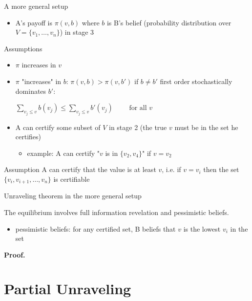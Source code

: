 \documentclass[bigger]{beamer}
\begin{document}
\begin{frame}[label={sec:orgheadline4}]{A more general setup}
\begin{itemize}
\item A's payoff is \(\pi(v,b)\) where \(b\) is B's belief (probability distribution over  \(V=\{v_1,\dots,v_n\}\)) in stage 3
\end{itemize}
\begin{block}{Assumptions}
\begin{itemize}
\item \(\pi\) increases in \(v\)
\item \(\pi\) "increases" in \(b\): \(\pi(v,b)>\pi(v,b')\) if \(b\neq b'\) first order stochastically dominates \(b'\):

\(\sum_{v_j\leq v}b(v_j)\leq \sum_{v_j\leq v}b'(v_j)\qquad\text{ for all }v\)
\end{itemize}
\end{block}

\begin{itemize}
\item A can certify some subset of \(V\) in stage 2 (the true \(v\) must be in the set he certifies)
\begin{itemize}
\item example:  A can certify "\(v\) is in \(\{v_2,v_4\}\)" if \(v=v_2\)
\end{itemize}
\end{itemize}
\begin{block}{Assumption}
A can certify that the value is at least \(v\), i.e. if \(v=v_i\) then the set \(\{v_i,v_{i+1},\dots,v_n\}\) is certifiable
\end{block}
\end{frame}

\begin{frame}[label={sec:orgheadline5}]{Unraveling theorem in the more general setup}
\begin{theorem}[Unraveling]
The equilibrium involves full information revelation and pessimistic beliefs.
\end{theorem}
\begin{itemize}
\item pessimistic beliefs: for any certified set, B beliefs that \(v\) is the lowest \(v_i\) in the set
\end{itemize}

\textbf{Proof. } 
\end{frame}

\section{Partial Unraveling}
\label{sec:orgheadline13}
\end{document}
